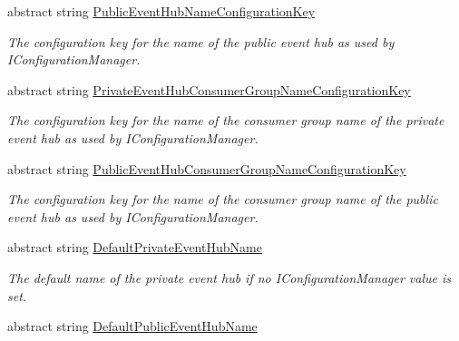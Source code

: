 \begin{DoxyCompactItemize}
abstract string \hyperlink{classCqrs_1_1Azure_1_1ServiceBus_1_1AzureEventHub_a3ef1f56ad3de3bf8337f68e73627fab2_a3ef1f56ad3de3bf8337f68e73627fab2}{Public\+Event\+Hub\+Name\+Configuration\+Key}
\begin{DoxyCompactList}\small\item\em The configuration key for the name of the public event hub as used by I\+Configuration\+Manager. \end{DoxyCompactList}\item 
abstract string \hyperlink{classCqrs_1_1Azure_1_1ServiceBus_1_1AzureEventHub_ad2095d284821cff883fef5a2a5aec90e_ad2095d284821cff883fef5a2a5aec90e}{Private\+Event\+Hub\+Consumer\+Group\+Name\+Configuration\+Key}
\begin{DoxyCompactList}\small\item\em The configuration key for the name of the consumer group name of the private event hub as used by I\+Configuration\+Manager. \end{DoxyCompactList}\item 
abstract string \hyperlink{classCqrs_1_1Azure_1_1ServiceBus_1_1AzureEventHub_a36b035065fd3fc38ac136adc59742d34_a36b035065fd3fc38ac136adc59742d34}{Public\+Event\+Hub\+Consumer\+Group\+Name\+Configuration\+Key}
\begin{DoxyCompactList}\small\item\em The configuration key for the name of the consumer group name of the public event hub as used by I\+Configuration\+Manager. \end{DoxyCompactList}\item 
abstract string \hyperlink{classCqrs_1_1Azure_1_1ServiceBus_1_1AzureEventHub_a8912bae90f45042ed41ff7a7632c178f_a8912bae90f45042ed41ff7a7632c178f}{Default\+Private\+Event\+Hub\+Name}
\begin{DoxyCompactList}\small\item\em The default name of the private event hub if no I\+Configuration\+Manager value is set. \end{DoxyCompactList}\item 
abstract string \hyperlink{classCqrs_1_1Azure_1_1ServiceBus_1_1AzureEventHub_a11645c85a3c749ca664480867c6fae3c_a11645c85a3c749ca664480867c6fae3c}{Default\+Public\+Event\+Hub\+Name}

\end{DoxyCompactItemize}
